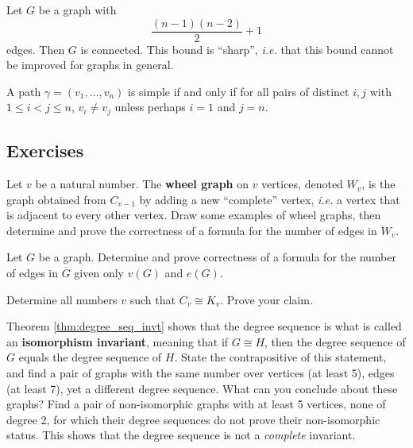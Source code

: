 \begin{theorem} Let $G$ be a graph with
$$\frac{(n-1)(n-2)}{2} +1$$
edges.  Then $G$ is connected.  This bound is ``sharp'', \textit{i.e.} that this bound cannot be improved for graphs in general.
\end{theorem}

\begin{theorem} A path $\gamma= (v_1, \ldots, v_n)$ is simple if and only if for all pairs of distinct $i, j$ with $1\leq i < j\leq n$, $v_i \neq v_j$ unless perhaps $i=1$ and $j=n$.
\end{theorem}


\subsection{Exercises}
\begin{exercise} Let $v$ be a natural number.  The \textbf{wheel graph} on $v$ vertices, denoted $W_v$, is the graph obtained from $C_{v-1}$ by adding a new ``complete'' vertex, \textit{i.e.} a vertex that is adjacent to every other vertex.  Draw some examples of wheel graphs, then determine and prove the correctness of a formula for the number of edges in $W_v$.
\end{exercise}

\begin{exercise} Let $G$ be a graph.  Determine and prove correctness of a formula for the number of edges in $\overline{G}$ given only $v(G)$ and $e(G)$.
\end{exercise}

\begin{exercise} Determine all numbers $v$ such that $C_v \cong K_v$. Prove your claim.
\end{exercise}

\begin{exercise} Theorem \ref{thm:degree_seq_invt} shows that the degree sequence is what is called an \textbf{isomorphism invariant}, meaning that if $G \cong H$, then the degree sequence of $G$ equals the degree sequence of $H$.  State the contrapositive of this statement, and find a pair of graphs with the same number over vertices (at least 5), edges (at least 7), yet a different degree sequence.  What can you conclude about these graphs?  Find a pair of non-isomorphic graphs with at least 5 vertices, none of degree 2, for which their degree sequences do not prove their non-isomorphic status.  This shows that the degree sequence is not a \textit{complete} invariant.
\end{exercise}

